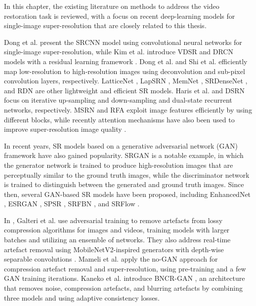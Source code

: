 \label{chap:Background}

In this chapter, the existing literature on methods to address the video restoration task is reviewed, with a focus on recent deep-learning models for single-image super-resolution that are closely related to this thesis.

Dong et al. \cite{dong2014learning} present the SRCNN model using convolutional neural networks for single-image super-resolution, while Kim et al. introduce VDSR \cite{kim2016accurate} and DRCN \cite{kim2016deeply} models with a residual learning framework \cite{he2016deep}. Dong et al. \cite{dong2016accelerating} and Shi et al. \cite{shi2016real} efficiently map low-resolution to high-resolution images using deconvolution and sub-pixel convolution layers, respectively. LatticeNet \cite{luo2020latticenet}, LapSRN \cite{lai2017deep}, MemNet \cite{tai2017memnet}, SRDenseNet \cite{tong2017image}, and RDN \cite{zhang2018residual} are other lightweight and efficient SR models. Haris et al. \cite{haris2018deep} and DSRN \cite{han2018image} focus on iterative up-sampling and down-sampling and dual-state recurrent networks, respectively. MSRN \cite{li2018multi} and RFA \cite{liu2020residual} exploit image features efficiently by using different blocks, while recently attention mechanisms have also been used to improve super-resolution image quality \cite{dai2019second, mei2020image, niu2020single, zhang2018image}.

In recent years, SR models based on a generative adversarial network (GAN) framework have also gained popularity. SRGAN \cite{ledig2017photo} is a notable example, in which the generator network is trained to produce high-resolution images that are perceptually similar to the ground truth images, while the discriminator network is trained to distinguish between the generated and ground truth images. Since then, several GAN-based SR models have been proposed, including EnhancedNet \cite{sajjadi2017enhancenet}, ESRGAN \cite{wang2018esrgan}, SPSR \cite{ma2020structure}, SRFBN \cite{li2019feedback}, and SRFlow \cite{lugmayr2020srflow}.

In \cite{galteri2017deep}, Galteri et al. use adversarial training to remove artefacts from lossy compression algorithms for images and videos, training models with larger batches and utilizing an ensemble of networks. They also address real-time artefact removal using MobileNetV2-inspired generators with depth-wise separable convolutions \cite{galteri2019towards, galteri2019fast}. Mameli et al. \cite{mameli2020image} apply the no-GAN approach for compression artefact removal and super-resolution, using pre-training and a few GAN training iterations. Kaneko et al. introduce BNCR-GAN \cite{kaneko2021blur}, an architecture that removes noise, compression artefacts, and blurring artefacts by combining three models and using adaptive consistency losses.

